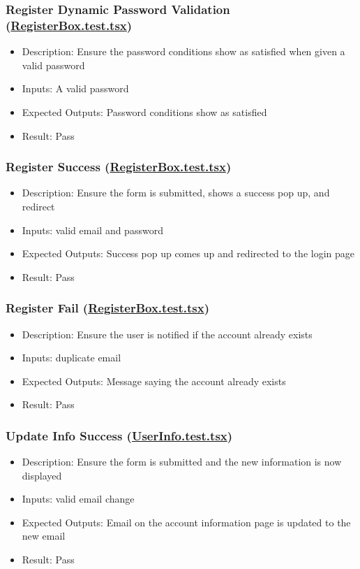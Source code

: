 \documentclass[12pt, titlepage]{article}
\begin{document}
\subsubsection{Register Dynamic Password Validation (\href{https://github.com/OKKM-insights/frontend/blob/main/tests/__tests__/RegisterBox.test.tsx}{RegisterBox.test.tsx})}
\begin{itemize}
    \item Description: Ensure the password conditions show as satisfied when given a valid password
    \item Inputs: A valid password
    \item Expected Outputs: Password conditions show as satisfied
    \item Result: Pass
\end{itemize}
\subsubsection{Register Success (\href{https://github.com/OKKM-insights/frontend/blob/main/tests/__tests__/RegisterBox.test.tsx}{RegisterBox.test.tsx})}
\begin{itemize}
    \item Description: Ensure the form is submitted, shows a success pop up, and redirect
    \item Inputs: valid email and password
    \item Expected Outputs: Success pop up comes up and redirected to the login page
    \item Result: Pass
\end{itemize}
\subsubsection{Register Fail (\href{https://github.com/OKKM-insights/frontend/blob/main/tests/__tests__/RegisterBox.test.tsx}{RegisterBox.test.tsx})}
\begin{itemize}
    \item Description: Ensure the user is notified if the account already exists
    \item Inputs: duplicate email
    \item Expected Outputs: Message saying the account already exists
    \item Result: Pass
\end{itemize}
\subsubsection{Update Info Success (\href{https://github.com/OKKM-insights/frontend/blob/main/tests/__tests__/UserInfo.test.tsx}{UserInfo.test.tsx})}
\begin{itemize}
    \item Description: Ensure the form is submitted and the new information is now displayed
    \item Inputs: valid email change
    \item Expected Outputs: Email on the account information page is updated to the new email
    \item Result: Pass
\end{itemize}
\end{document}
